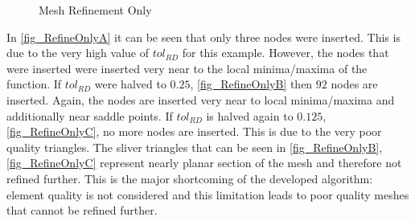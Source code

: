 \begin{figure}[h!]
  \begin{center}
  \label{fig_RefineOnly}


  \caption{Mesh Refinement Only}
  \end{center}
\end{figure}

In \ref{fig_RefineOnlyA} it can be seen that only three nodes were
inserted. This is due to the very high value of $tol_{RD}$ for this
example.  However, the nodes that were inserted were inserted very near
to the local minima/maxima of the function. If $tol_{RD}$ were halved to
$0.25$, \ref{fig_RefineOnlyB} then $92$ nodes are inserted. Again, the
nodes are inserted very near to local minima/maxima and additionally
near saddle points. If $tol_{RD}$ is halved again to $0.125$,
\ref{fig_RefineOnlyC}, no more nodes are inserted. This is due to the
very poor quality triangles.  The sliver triangles that can be seen in
\ref{fig_RefineOnlyB}, \ref{fig_RefineOnlyC} represent nearly planar section
of the mesh and therefore not refined further. This is the major
shortcoming of the developed algorithm: element quality is not
considered and this limitation leads to poor quality meshes that cannot
be refined further.

